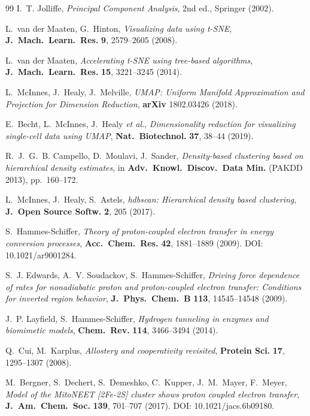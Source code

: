 \documentclass[11pt,a4paper,twoside]{article}
\theoremstyle{remark}
\begin{document}
\begin{thebibliography}{99}
I.~T. Jolliffe,
\emph{Principal Component Analysis},
2nd ed., Springer (2002).

L.~van der Maaten, G.~Hinton,
\emph{Visualizing data using t-SNE},
\textbf{J.\ Mach.\ Learn.\ Res.} \textbf{9}, 2579--2605 (2008).

L.~van der Maaten,
\emph{Accelerating t-SNE using tree-based algorithms},
\textbf{J.\ Mach.\ Learn.\ Res.} \textbf{15}, 3221--3245 (2014).

L.~McInnes, J.~Healy, J.~Melville,
\emph{UMAP: Uniform Manifold Approximation and Projection for
Dimension Reduction},
\textbf{arXiv} 1802.03426 (2018).

E.~Becht, L.~McInnes, J.~Healy \emph{et al.},
\emph{Dimensionality reduction for visualizing single-cell data using
UMAP},
\textbf{Nat.\ Biotechnol.} \textbf{37}, 38--44 (2019).

R.~J.~G.~B. Campello, D.~Moulavi, J.~Sander,
\emph{Density-based clustering based on hierarchical density estimates},
in \textbf{Adv.\ Knowl.\ Discov.\ Data Min.} (PAKDD 2013), pp.~160--172.

L.~McInnes, J.~Healy, S.~Astels,
\emph{hdbscan: Hierarchical density based clustering},
\textbf{J.\ Open Source Softw.} \textbf{2}, 205 (2017).


S.~Hammes-Schiffer,
\emph{Theory of proton-coupled electron transfer in energy conversion
processes},
\textbf{Acc.\ Chem.\ Res.} \textbf{42}, 1881--1889 (2009).
DOI: 10.1021/ar9001284.

S.~J. Edwards, A.~V. Soudackov, S.~Hammes-Schiffer,
\emph{Driving force dependence of rates for nonadiabatic proton and
proton-coupled electron transfer: Conditions for inverted region behavior},
\textbf{J.\ Phys.\ Chem.\ B} \textbf{113}, 14545--14548 (2009).

J.~P. Layfield, S.~Hammes-Schiffer,
\emph{Hydrogen tunneling in enzymes and biomimetic models},
\textbf{Chem.\ Rev.} \textbf{114}, 3466--3494 (2014).

Q.~Cui, M.~Karplus,
\emph{Allostery and cooperativity revisited},
\textbf{Protein Sci.} \textbf{17}, 1295--1307 (2008).

M.~Bergner, S.~Dechert, S.~Demeshko, C.~Kupper, J.~M.~Mayer, F.~Meyer,
\emph{Model of the {MitoNEET} {[}2Fe-2S{]} cluster shows proton coupled
electron transfer},
\textbf{J.\ Am.\ Chem.\ Soc.} \textbf{139}, 701--707 (2017).
DOI: 10.1021/jacs.6b09180.


\end{thebibliography}
\end{document}

